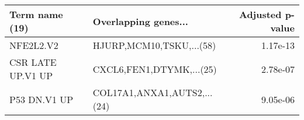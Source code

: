 \begin{tabular}{llr}
\toprule
   Term name (19) &        Overlapping genes... &  Adjusted p-value \\
\midrule
        NFE2L2.V2 &    HJURP,MCM10,TSKU,...(58) &          1.17e-13 \\
CSR LATE UP.V1 UP &    CXCL6,FEN1,DTYMK,...(25) &          2.78e-07 \\
     P53 DN.V1 UP & COL17A1,ANXA1,AUTS2,...(24) &          9.05e-06 \\
\bottomrule
\end{tabular}
